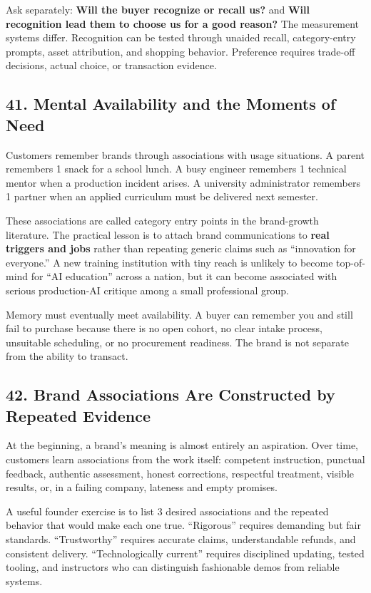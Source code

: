 Ask separately: \textbf{Will the buyer recognize or recall us?} and \textbf{Will recognition lead them to choose us for a good reason?} The measurement systems differ. Recognition can be tested through unaided recall, category-entry prompts, asset attribution, and shopping behavior. Preference requires trade-off decisions, actual choice, or transaction evidence.

\subsection*{41. Mental Availability and the Moments of Need}

Customers remember brands through associations with usage situations. A parent remembers 1 snack for a school lunch. A busy engineer remembers 1 technical mentor when a production incident arises. A university administrator remembers 1 partner when an applied curriculum must be delivered next semester.

These associations are called category entry points in the brand-growth literature. The practical lesson is to attach brand communications to \textbf{real triggers and jobs} rather than repeating generic claims such as ``innovation for everyone.'' A new training institution with tiny reach is unlikely to become top-of-mind for ``AI education'' across a nation, but it can become associated with serious production-AI critique among a small professional group.

Memory must eventually meet availability. A buyer can remember you and still fail to purchase because there is no open cohort, no clear intake process, unsuitable scheduling, or no procurement readiness. The brand is not separate from the ability to transact.

\subsection*{42. Brand Associations Are Constructed by Repeated Evidence}

At the beginning, a brand's meaning is almost entirely an aspiration. Over time, customers learn associations from the work itself: competent instruction, punctual feedback, authentic assessment, honest corrections, respectful treatment, visible results, or, in a failing company, lateness and empty promises.

A useful founder exercise is to list 3 desired associations and the repeated behavior that would make each one true. ``Rigorous'' requires demanding but fair standards. ``Trustworthy'' requires accurate claims, understandable refunds, and consistent delivery. ``Technologically current'' requires disciplined updating, tested tooling, and instructors who can distinguish fashionable demos from reliable systems.

